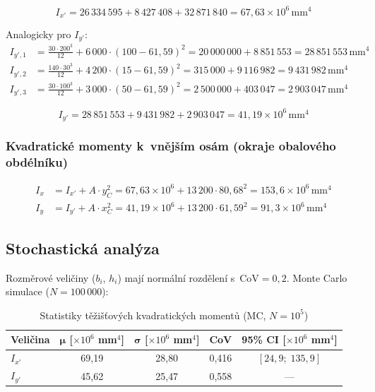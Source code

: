 \documentclass[a4paper,11pt]{article}
\newcommand{\unit}[1]{\,\mathrm{#1}}
\newcommand{\E}[1]{\times 10^{#1}}
\begin{document}
\begin{equation}
    \boxed{I_{x'} = 26\,334\,595 + 8\,427\,408 + 32\,871\,840 = 67{,}63 \E{6}\unit{mm^4}}
\end{equation}

Analogicky pro $I_{y'}$:
\begin{align}
    I_{y',1} &= \tfrac{30 \cdot 200^3}{12} + 6\,000 \cdot (100 - 61{,}59)^2 = 20\,000\,000 + 8\,851\,553 = 28\,851\,553\unit{mm^4} \\
    I_{y',2} &= \tfrac{140 \cdot 30^3}{12} + 4\,200 \cdot (15 - 61{,}59)^2 = 315\,000 + 9\,116\,982 = 9\,431\,982\unit{mm^4} \\
    I_{y',3} &= \tfrac{30 \cdot 100^3}{12} + 3\,000 \cdot (50 - 61{,}59)^2 = 2\,500\,000 + 403\,047 = 2\,903\,047\unit{mm^4}
\end{align}

\begin{equation}
    \boxed{I_{y'} = 28\,851\,553 + 9\,431\,982 + 2\,903\,047 = 41{,}19 \E{6}\unit{mm^4}}
\end{equation}

\subsubsection{Kvadratické momenty k~vnějším osám (okraje obalového obdélníku)}

\begin{align}
    I_x &= I_{x'} + A \cdot y_C^2 = 67{,}63 \E{6} + 13\,200 \cdot 80{,}68^2 = \boxed{153{,}6 \E{6}\unit{mm^4}} \\
    I_y &= I_{y'} + A \cdot x_C^2 = 41{,}19 \E{6} + 13\,200 \cdot 61{,}59^2 = \boxed{91{,}3 \E{6}\unit{mm^4}}
\end{align}

\subsection{Stochastická analýza}

Rozměrové veličiny ($b_i$, $h_i$) mají normální rozdělení s~$\mathrm{CoV} = 0{,}2$. Monte Carlo simulace ($N = 100\,000$):

\begin{table}[H]
\centering
\caption{Statistiky těžišťových kvadratických momentů (MC, $N = 10^5$)}
\begin{tabular}{lcccc}
\toprule
\textbf{Veličina} & $\boldsymbol{\mu}$ [$\E{6}$ mm$^4$] & $\boldsymbol{\sigma}$ [$\E{6}$ mm$^4$] & \textbf{CoV} & \textbf{95\% CI} [$\E{6}$ mm$^4$] \\
\midrule
$I_{x'}$ & 69{,}19 & 28{,}80 & 0{,}416 & $[24{,}9;\; 135{,}9]$ \\
$I_{y'}$ & 45{,}62 & 25{,}47 & 0{,}558 & --- \\
\bottomrule
\end{tabular}
\end{table}
\end{document}
